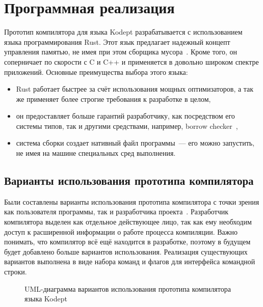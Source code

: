 \chapter{Программная реализация}
\label{ch:chap3_soft_architecture}


Прототип компилятора для языка Kodept разрабатывается с использованием языка программирования Rust.
Этот язык предлагает надежный концепт управления памятью, не имея при этом сборщика мусора~\cite{RustMemory}.
Кроме того, он соперничает по скорости с C и C++ и применяется в довольно широком спектре приложений.
Основные преимущества выбора этого языка:
\begin{itemize}
    \item Rust работает быстрее за счёт использования мощных оптимизаторов, а так же применяет более строгие требования к разработке в целом,
    \item он предоставляет больше гарантий разработчику, как посредством его системы типов, так и другими средствами, например, borrow checker~\cite{RustBchk},
    \item система сборки создает нативный файл программы~--- его можно запустить, не имея на машине специальных сред выполнения.
\end{itemize}

\section{Варианты использования прототипа компилятора}
\label{sec:usage}

Были составлены варианты использования прототипа компилятора с точки зрения как пользователя программы, так и разработчика проекта~.
Разработчик компилятора выделен как отдельное действующее лицо, так как ему необходим доступ к расширенной информации о работе процесса компиляции.
Важно понимать, что компилятор всё ещё находится в разработке, поэтому в будущем будет добавлено больше вариантов использования.
Реализация существующих вариантов выполнена в виде набора команд и флагов для интерфейса командной строки.

\begin{figure}[H]
    \centering
    
    \caption{UML-диаграмма вариантов использования прототипа компилятора языка Kodept}
    \label{fig:usage}
\end{figure}

